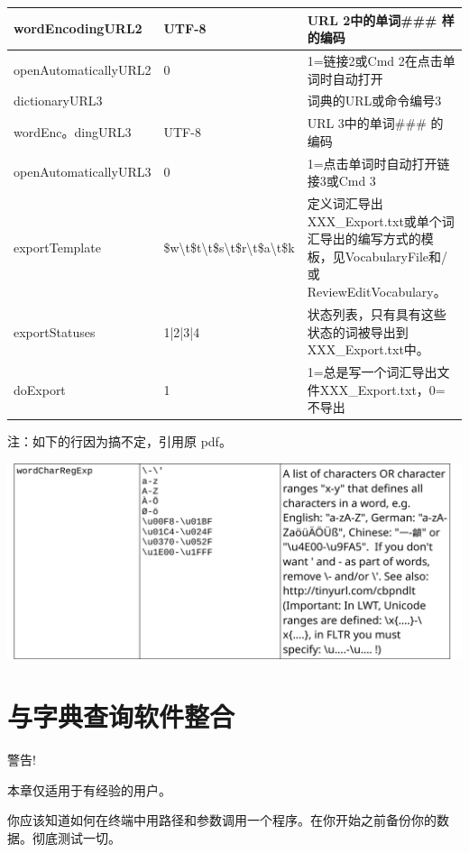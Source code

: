 \documentclass[cn,10pt,math=newtx,citestyle=gb7714-2015,bibstyle=gb7714-2015]{elegantbook}
\begin{document}
\begin{table}[htbp]
\begin{tabularx}{\textwidth}{|X|X|X|}
	wordEncodingURL2 & UTF-8 & URL 2中的单词\#\#\# 样的编码 \\ \hline
	openAutomaticallyURL2 & 0 & 1=链接2或Cmd 2在点击单词时自动打开 \\ \hline
	dictionaryURL3 &  & 词典的URL或命令编号3 \\ \hline
	wordEnc。dingURL3 & UTF-8 & URL 3中的单词\#\#\# 的编码 \\ \hline
		
	openAutomaticallyURL3 & 0  & 1=点击单词时自动打开链接3或Cmd 3 \\ \hline

exportTemplate & \$w\textbackslash{}t\$t\textbackslash{}t\$s\textbackslash{}t\$r\textbackslash{}t\$a\textbackslash{}t\$k & 定义词汇导出XXX\_Export.txt或单个词汇导出的编写方式的模板，见VocabularyFile和/或ReviewEditVocabulary。\\ \hline

	exportStatuses & 1|2|3|4 &状态列表，只有具有这些状态的词被导出到XXX\_Export.txt中。\\ \hline
doExport & 1 & 1=总是写一个词汇导出文件XXX\_Export.txt，0=不导出 \\ \hline
\end{tabularx}
\end{table}

注：如下的行因为搞不定，引用原 pdf。

\includegraphics[width=\textwidth]{image/table2.png}


\chapter{与字典查询软件整合}\label{与字典查询软件整合}
\begin{bclogo}[logo=\bcattention, noborder=false, barre=none]{警告!} %

本章仅适用于有经验的用户。

你应该知道如何在终端中用路径和参数调用一个程序。在你开始之前备份你的数据。彻底测试一切。
\end{bclogo}
\end{document}
